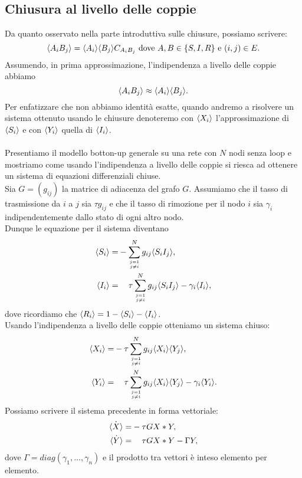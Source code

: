 \subsection{Chiusura al livello delle coppie}
Da quanto osservato nella parte introduttiva sulle chiusure, possiamo scrivere:
$$ \langle  A_i B_j \rangle = \langle  A_i \rangle \langle B_j \rangle C_{A_i B_j} \text{ dove } A,B\in \{S,I,R\} \text{ e } (i,j)\in E.$$ 
Assumendo, in prima approssimazione, l'indipendenza a livello delle coppie abbiamo 
$$ \langle  A_i B_j \rangle \approx \langle A_i \rangle\langle B_j \rangle.$$ 
Per enfatizzare che non abbiamo identit\`a esatte, quando andremo a risolvere un sistema ottenuto usando le chiusure denoteremo  con $\langle X_i \rangle$ l'approssimazione di $\langle  S_i \rangle$ e con $\langle  Y_i \rangle$ quella di $\langle  I_i \rangle$.\\ \\
Presentiamo il modello botton-up generale su una rete con $N$ nodi senza loop e mostriamo come usando l'indipendenza a livello delle coppie si riesca ad ottenere un sistema di equazioni differenziali chiuse.\\
Sia $G=(g_{ij})$ la matrice di adiacenza del grafo $G$. Assumiamo che il tasso di trasmissione da $i$ a $j$ sia $\tau g_{ij}$ e che il tasso di rimozione per il nodo $i$ sia $\gamma_i$ indipendentemente dallo stato di ogni altro nodo.\\
Dunque le equazione per il sistema diventano
\begin{equation}
\begin{aligned}
	 \angol{ S_i} =& - \sum_{j=1\atop{j\neq i }}^N g_{ij} \angol{ S_i I_j},\\
	 \angol{I_i} =&\spa \tau \sum_{j=1\atop{j\neq i}}^N  g_{ij} \angol{ S_i I_j} -\gamma_i \angol{I_i},
\end{aligned}
\end{equation}
dove ricordiamo che $\langle R_i \rangle=1-\langle S_i \rangle- \langle I_i \rangle$.\\
Usando l'indipendenza a livello delle coppie otteniamo  un sistema chiuso: 
\begin{equation}
\begin{aligned}
	 \angol{ X_i} =& -\tau \sum_{j=1\atop{j\neq i }}^N g_{ij}\angol{ X_i} \angol{Y_j},\\
	 \angol{Y_i} =&\spa \tau \sum_{j=1\atop{j\neq i}}^N  g_{ij}\angol{ X_i}\angol{Y_j} -\gamma_i \angol{Y_i}.
\end{aligned}
\label{Chiuso_coppie}
\end{equation}
Possiamo scrivere il sistema precedente in forma vettoriale:
\begin{equation}
	\begin{aligned}
	\dot{\angol{X}} = & - \tau G X * Y,\\
	\dot{\angol{Y}}=& \spa \tau G X * Y - \Gamma Y,	
	\end{aligned}
\end{equation}
dove $\Gamma=diag(\gamma_1, \dots, \gamma_n)$ e il prodotto tra vettori \`e inteso elemento per elemento.\\

